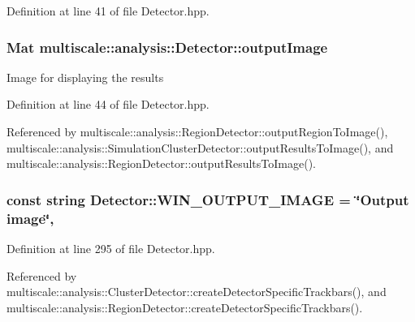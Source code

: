 Definition at line 41 of file Detector.\-hpp.

\hypertarget{classmultiscale_1_1analysis_1_1Detector_a144e080a3af03c9bf3d8a80315823c86}{
\subsubsection[{output\-Image}]{\setlength{\rightskip}{0pt plus 5cm}Mat multiscale\-::analysis\-::\-Detector\-::output\-Image\hspace{0.3cm}{\ttfamily [protected]}}}\label{classmultiscale_1_1analysis_1_1Detector_a144e080a3af03c9bf3d8a80315823c86}
Image for displaying the results 

Definition at line 44 of file Detector.\-hpp.



Referenced by multiscale\-::analysis\-::\-Region\-Detector\-::output\-Region\-To\-Image(), multiscale\-::analysis\-::\-Simulation\-Cluster\-Detector\-::output\-Results\-To\-Image(), and multiscale\-::analysis\-::\-Region\-Detector\-::output\-Results\-To\-Image().

\hypertarget{classmultiscale_1_1analysis_1_1Detector_a883b5de8d273a2bfab31e45bc285c78d}{
\subsubsection[{W\-I\-N\-\_\-\-O\-U\-T\-P\-U\-T\-\_\-\-I\-M\-A\-G\-E}]{\setlength{\rightskip}{0pt plus 5cm}const string Detector\-::\-W\-I\-N\-\_\-\-O\-U\-T\-P\-U\-T\-\_\-\-I\-M\-A\-G\-E = \char`\"{}Output {\bf image}\char`\"{}\hspace{0.3cm}{\ttfamily [static]}, {\ttfamily [protected]}}}\label{classmultiscale_1_1analysis_1_1Detector_a883b5de8d273a2bfab31e45bc285c78d}


Definition at line 295 of file Detector.\-hpp.



Referenced by multiscale\-::analysis\-::\-Cluster\-Detector\-::create\-Detector\-Specific\-Trackbars(), and multiscale\-::analysis\-::\-Region\-Detector\-::create\-Detector\-Specific\-Trackbars().

